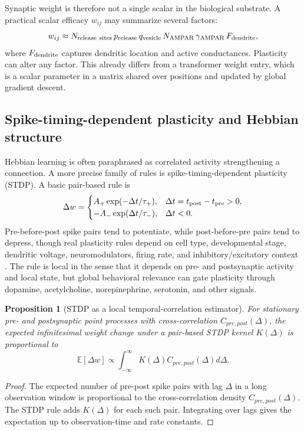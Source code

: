 \documentclass[11pt]{article}
\newtheorem{proposition}[definition]{Proposition}
\newcommand{\E}{\mathbb{E}}
\newcommand{\1}{\mathbf{1}}
\begin{document}
Synaptic weight is therefore not a single scalar in the biological substrate. A practical scalar efficacy $w_{ij}$ may summarize several factors:
\[
w_{ij}\approx N_{\rm release\ sites}\,p_{\rm release}\,q_{\rm vesicle}\,N_{\rm AMPAR}\,\gamma_{\rm AMPAR}\,F_{\rm dendrite},
\]
where $F_{\rm dendrite}$ captures dendritic location and active conductances. Plasticity can alter any factor. This already differs from a transformer weight entry, which is a scalar parameter in a matrix shared over positions and updated by global gradient descent.

\subsection{Spike-timing-dependent plasticity and Hebbian structure}

Hebbian learning is often paraphrased as correlated activity strengthening a connection. A more precise family of rules is spike-timing-dependent plasticity (STDP). A basic pair-based rule is
\[
\Delta w =
\begin{cases}
A_+\exp(-\Delta t/\tau_+), & \Delta t=t_{\rm post}-t_{\rm pre}>0,\\
-A_-\exp(\Delta t/\tau_-), & \Delta t<0.
\end{cases}
\]
Pre-before-post spike pairs tend to potentiate, while post-before-pre pairs tend to depress, though real plasticity rules depend on cell type, developmental stage, dendritic voltage, neuromodulators, firing rate, and inhibitory/excitatory context \cite{Markram1997,BiPoo1998,Sjostrom2008}. The rule is local in the sense that it depends on pre- and postsynaptic activity and local state, but global behavioral relevance can gate plasticity through dopamine, acetylcholine, norepinephrine, serotonin, and other signals.

\begin{proposition}[STDP as a local temporal-correlation estimator]
For stationary pre- and postsynaptic point processes with cross-correlation $C_{pre,post}(\Delta)$, the expected infinitesimal weight change under a pair-based STDP kernel $K(\Delta)$ is proportional to
\[
\E[\Delta w]\propto \int_{-\infty}^{\infty} K(\Delta)C_{pre,post}(\Delta)d\Delta.
\]
\end{proposition}
\begin{proof}
The expected number of pre-post spike pairs with lag $\Delta$ in a long observation window is proportional to the cross-correlation density $C_{pre,post}(\Delta)$. The STDP rule adds $K(\Delta)$ for each such pair. Integrating over lags gives the expectation up to observation-time and rate constants.
\end{proof}
\end{document}
